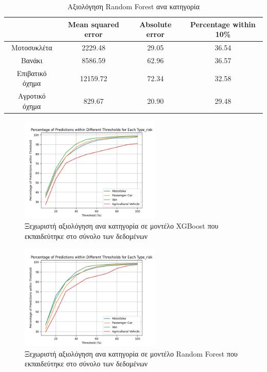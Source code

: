 \documentclass{llncs}
\begin{document}
\begin{table}
    \centering
    \begin{tabular}{|c|c|c|c|} %
        \hline
         &Mean squared error & Absolute error & Percentage within 10\% \\ %
        \hline
        Μοτοσυκλέτα & 2229.48 & 29.05 & 36.54 \\
        Βανάκι & 8586.59 & 62.96 & 36.57 \\
        Επιβατικό όχημα & 12159.72 & 72.34 & 32.58 \\
        Αγροτικό όχημα & 829.67 & 20.90 & 29.48 \\
        \hline
    \end{tabular}
    \caption{Αξιολόγηση Random Forest ανα κατηγορία}
    \label{tab:RandomForest_cat_together}
\end{table}


\begin{figure}
    \begin{center}
        \includegraphics[width=0.6\textwidth]{images/combined_trained_individual_thresholds_xgb.png}
    \end{center}
    \caption{Ξεχωριστή αξιολόγηση ανα κατηγορία σε μοντέλο XGBoost που εκπαιδεύτηκε στο σύνολο των δεδομένων}  
    \label{fig:XGBoost_result_all_individual}  
\end{figure}

\begin{figure}
    \begin{center}
        \includegraphics[width=0.6\textwidth]{images/combined_trained_individual_thresholds_random_forest.png}
    \end{center}
    \caption{Ξεχωριστή αξιολόγηση ανα κατηγορία σε μοντέλο Random Forest που εκπαιδεύτηκε στο σύνολο των δεδομένων}  
    \label{fig:random_forest_result_all_individual}  
\end{figure}
\end{document}
